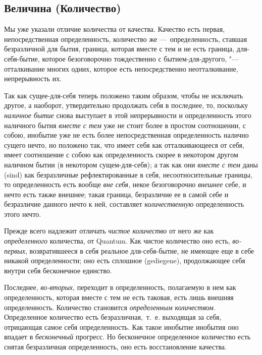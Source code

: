 \clearpage\setcounter{page}{1}\subsection[Второй отделВеличина
(Количество)]{\newline
Величина (Количество)}
Мы уже указали отличие количества от качества. Качество есть первая,
непосредственная определенность, количество же —~определенность, ставшая
безразличной для бытия, граница, которая вместе с тем и не есть граница,
для-себя-бытие, которое безоговорочно тождественно с бытием-для-другого,
"--- отталкивание многих одних, которое есть непосредственно
неотталкивание, непрерывность их.

Так как сущее-для-себя теперь положено таким образом, чтобы не исключать
другое, а наоборот, утвердительно продолжать себя в последнее, то,
поскольку {\em наличное бытие} снова выступает в этой
непрерывности и определенность этого наличного бытия
{\em вместе с тем} уже не стоит более в простом
соотношении, с собою, инобытие уже не есть более непосредственная
определенность налично сущего нечто, но положено так, что имеет себя как
отталкивающееся от себя, имеет соотношение с собою как определенность
скорее в некотором другом наличном бытии (в некотором сущем-для-себя); а
так как они {\em вместе с тем} даны
(sind) как безразличные рефлектированные в себя,
несоотносительные границы, то определенность есть вообще
{\em вне себя}, некое безоговорочно
{\em внешнее} себе, и нечто есть также внешнее; такая
граница, безразличие ее в самой себе и безразличие данного нечто к ней,
составляет {\em количественную} определенность этого
нечто.

Прежде всего надлежит отличать {\em чистое количество}
от него же как {\em определенного} количества, от
Quantum. Как чистое количество оно есть,
{\em во-первых}, возвратившееся в себя реальное
для-себя-бытие, не имеющее еще в себе никакой определенности; оно есть
сплошное (gediegene), продолжающее себя внутри
себя бесконечное единство.

Последнее, {\em во-вторых}, переходит в определенность,
полагаемую в нем как определенность, которая вместе с тем не есть таковая,
есть лишь внешняя определенность. Количество становится
{\em определенным количеством}. Определенное количество
есть безразличная,~т.~е. выходящая за себя, отрицающая самое себя
определенность. Как такое инобытие инобытия оно впадает в
{\em бесконечный} прогресс. Но бесконечное определенное
количество есть снятая безразличная определенность, оно есть восстановление
качества.


